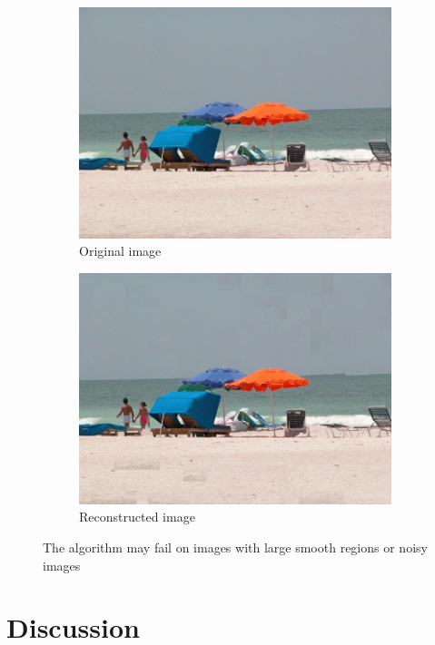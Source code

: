 \documentclass[11pt]{report}
\begin{document}
\begin{figure}
  \centering
  \begin{subfigure}{0.45\textwidth}
    \includegraphics[width=\textwidth]{../imData/540/8.jpg}
		\caption{Original image}
		\label{img:540_8}
	\end{subfigure}
  \begin{subfigure}{0.45\textwidth}
  \includegraphics[width=\textwidth]{8_solved.png}
		\caption{Reconstructed image}
		\label{img:540_8_reconstructed}
	\end{subfigure}
  \caption{The algorithm may fail on images with large smooth regions or noisy images}
  \label{fig:fail}
\end{figure}

\chapter{Discussion}

\nocite{*}



\end{document}
